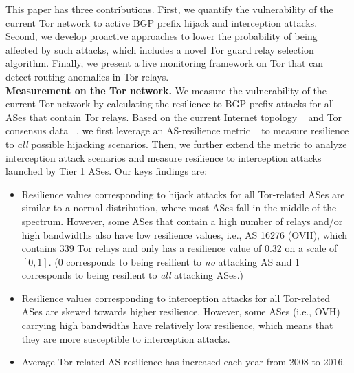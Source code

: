This paper has three contributions. First, we quantify the vulnerability of the current Tor network to active BGP prefix hijack and interception attacks. Second, we develop proactive approaches to lower the probability of being affected by such attacks, which includes a novel Tor guard relay selection algorithm. Finally, we present a live monitoring framework on Tor that can detect routing anomalies in Tor relays. 
\\
\textbf{Measurement on the Tor network.} We measure the vulnerability of the current Tor network by calculating the resilience to BGP prefix attacks for all ASes that contain Tor relays. Based on the current Internet topology ~\cite{topology} and Tor consensus data ~\cite{torconsensus}, we first leverage an AS-resilience metric ~\cite{lad2007understanding} to measure resilience to \emph{all} possible hijacking scenarios. Then, we further extend the metric to analyze interception attack scenarios and measure resilience to interception attacks launched by Tier 1 ASes. Our keys findings are:
\begin{itemize}
\item Resilience values corresponding to hijack attacks for all Tor-related ASes are similar to a normal distribution, where most ASes fall in the middle of the spectrum. However, some ASes that contain a high number of relays and/or high bandwidths also have low resilience values, i.e., AS 16276 (OVH), which contains 339 Tor relays and only has a resilience value of 0.32 on a scale of $[0,1]$. ($0$ corresponds to being resilient to \emph{no} attacking AS and $1$ corresponds to being resilient to \emph{all} attacking ASes.)
\item Resilience values corresponding to interception attacks for all Tor-related ASes are skewed towards higher resilience. However, some ASes (i.e., OVH) carrying high bandwidths have relatively low resilience, which means that they are more susceptible to interception attacks. 
\item Average Tor-related AS resilience has increased each year from 2008 to 2016. 
\end{itemize}
